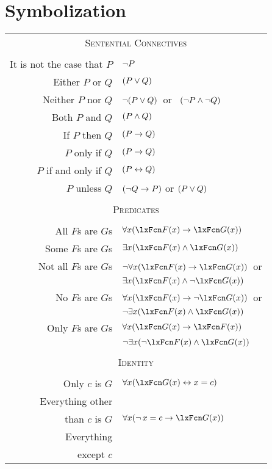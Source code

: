 \section{Symbolization}
\begin{center}
\label{app.symbolization}
\begin{tabular*}{\textwidth}{rl}
\multicolumn{2}{c}{\textsc{Sentential Connectives}}\\ \\
It is not the case that $P$ & $\neg P$\\
Either $P$ or $Q$ & $(P \vee Q)$\\
Neither $P$ nor $Q$ & $\neg(P \vee Q)$\ or \ $(\neg P \wedge \neg Q)$\\
Both $P$ and $Q$ & $(P \wedge Q)$\\
If $P$ then $Q$ & $(P \rightarrow Q)$\\
$P$ only if $Q$ & $(P \rightarrow Q)$\\
$P$ if and only if $Q$ & $(P \leftrightarrow Q)$\\
$P$ unless $Q$ & $(\neg Q \rightarrow P)$ or $(P \vee Q)$\\
\\
\multicolumn{2}{c}{\label{SymbolizingPredicates}\textsc{Predicates}}\\ \\
All $F$s are $G$s & $\forall x(\atom{F}{x} \eif \atom{G}{x})$\\
Some $F$s are $G$s & $\exists x(\atom{F}{x} \eand \atom{G}{x})$\\
Not all $F$s are $G$s & $\enot\forall x(\atom{F}{x} \eif \atom{G}{x})$\ or\\
& $\exists x(\atom{F}{x} \eand \enot \atom{G}{x})$\\
No $F$s are $G$s & $\forall x(\atom{F}{x} \eif\enot \atom{G}{x})$\ or\\
& $\enot\exists x(\atom{F}{x} \eand \atom{G}{x})$\\
Only $F$s are $G$s & $\forall x(\atom{G}{x} \eif \atom{F}{x})$\\
& $\enot\exists x(\enot\atom{F}{x} \eand \atom{G}{x})$\\
\\
\multicolumn{2}{c}{\textsc{Identity}}\\ \\
Only $c$ is $G$ & $\forall x(\atom{G}{x} \eiff x=c)$\\
Everything other &\\ than $c$ 
is $G$ & $\forall x(\enot\, {x = c} \eif \atom{G}{x} )$\\
Everything \\except $c$ 

\end{tabular*}
\end{center}
